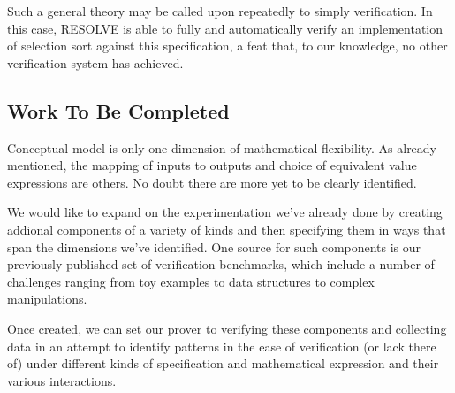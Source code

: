 Such a general theory may be called upon repeatedly to simply verification.  In this case, RESOLVE is able to fully and automatically verify an implementation of selection sort against this specification, a feat that, to our knowledge, no other verification system has achieved.

\subsection{Work To Be Completed}
Conceptual model is only one dimension of mathematical flexibility.  As already mentioned, the mapping of inputs to outputs and choice of equivalent value expressions are others.  No doubt there are more yet to be clearly identified.

We would like to expand on the experimentation we've already done by creating addional components of a variety of kinds and then specifying them in ways that span the dimensions we've identified.  One source for such components is our previously published set of verification benchmarks\cite{Benchmarks}, which include a number of challenges ranging from toy examples to data structures to complex manipulations.

Once created, we can set our prover to verifying these components and collecting data in an attempt to identify patterns in the ease of verification (or lack there of) under different kinds of specification and mathematical expression and their various interactions.
